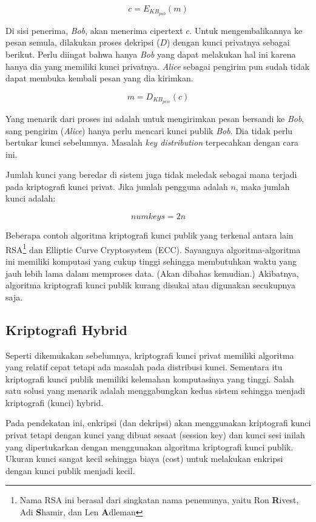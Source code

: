 \begin{equation}
   c = E_{KB_{pub}}(m)
\end{equation}

Di sisi penerima, {\em Bob}, akan menerima cipertext $c$. Untuk
mengembalikannya ke pesan semula, dilakukan proses dekripsi ($D$) dengan kunci
privatnya sebagai berikut. Perlu diingat bahwa hanya {\em Bob} yang dapat
melakukan hal ini karena hanya dia yang memiliki kunci privatnya. {\em Alice}
sebagai pengirim pun sudah tidak dapat membuka kembali pesan yang dia kirimkan.

\begin{equation}
   m = D_{KB_{priv}}(c)
\end{equation}

Yang menarik dari proses ini adalah untuk mengirimkan pesan bersandi ke {\em
Bob}, sang pengirim ({\em Alice}) hanya perlu mencari kunci publik {\em Bob}.
Dia tidak perlu bertukar kunci sebelumnya. Masalah {\em key distribution}
terpecahkan dengan cara ini.

Jumlah kunci yang beredar di sistem juga tidak meledak sebagai mana terjadi
pada kriptografi kunci privat. Jika jumlah pengguna adalah $n$, maka jumlah
kunci adalah:

\begin{equation}
   numkeys = 2n
\end{equation}

Beberapa contoh algoritma kriptografi kunci publik yang terkenal antara lain
RSA\footnote{Nama RSA ini berasal dari singkatan nama penemunya, yaitu Ron {\bf
R}ivest, Adi {\bf S}hamir, dan Len {\bf A}dleman} dan Elliptic Curve
Cryptosystem (ECC).  Sayangnya algoritma-algoritma ini memiliki komputasi yang
cukup tinggi sehingga membutuhkan waktu yang jauh lebih lama dalam memproses
data. (Akan dibahas kemudian.) Akibatnya, algoritma kriptografi kunci publik
kurang disukai atau digunakan secukupnya saja.


\subsection{Kriptografi Hybrid}
Seperti dikemukakan sebelumnya, kriptografi kunci privat memiliki algoritma
yang relatif cepat tetapi ada masalah pada distribusi kunci. Sementara itu
kriptografi kunci publik memiliki kelemahan komputasinya yang tinggi. Salah
satu solusi yang menarik adalah menggabungkan kedua sistem sehingga menjadi
kriptografi (kunci) hybrid.

Pada pendekatan ini, enkripsi (dan dekripsi) akan menggunakan kriptografi kunci
privat tetapi dengan kunci yang dibuat sesaat (session key) dan kunci sesi
inilah yang dipertukarkan dengan menggunakan algoritma kriptografi kunci
publik. Ukuran kunci sangat kecil sehingga biaya (cost) untuk melakukan
enkripsi dengan kunci publik menjadi kecil.


